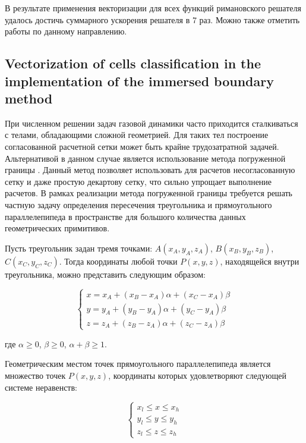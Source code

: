 \documentclass[
11pt,%
tightenlines,%
twoside,%
onecolumn,%
nofloats,%
nobibnotes,%
nofootinbib,%
superscriptaddress,%
noshowpacs,%
centertags]%
{revtex4}
\begin{document}
В результате применения векторизации для всех функций римановского решателя удалось достичь суммарного ускорения решателя в 7 раз.
Можно также отметить работы \cite{BaderSWEVect,FerreiraSWEVect} по данному направлению.

\subsection{Vectorization of cells classification in the implementation of the immersed boundary method}

При численном решении задач газовой динамики часто приходится сталкиваться с телами, обладающими сложной геометрией.
Для таких тел построение согласованной расчетной сетки может быть крайне трудозатратной задачей.
Альтернативой в данном случае является использование метода погруженной границы \cite{MittalIBM,TsengIBM}.
Данный метод позволяет использовать для расчетов несогласованную сетку и даже простую декартову сетку, что сильно упрощает выполнение расчетов.
В рамках реализации метода погруженной границы требуется решать частную задачу определения пересечения треугольника и прямоугольного параллелепипеда в пространстве для большого количества данных геометрических примитивов.

Пусть треугольник задан тремя точками: $A(x_A, y_A, z_A)$, $B(x_B, y_B, z_B)$, $C(x_C, y_C, z_C)$.
Тогда координаты любой точки $P(x, y, z)$, находящейся внутри треугольника, можно представить следующим образом:

\begin{equation}
\begin{cases}
x = x_A + (x_B - x_A)\alpha + (x_C - x_A)\beta \\
y = y_A + (y_B - y_A)\alpha + (y_C - y_A)\beta \\
z = z_A + (z_B - z_A)\alpha + (z_C - z_A)\beta
\end{cases}
\end{equation}

где $\alpha \ge 0$, $\beta \ge 0$, $\alpha + \beta \ge 1$.

Геометрическим местом точек прямоугольного параллелепипеда является множество точек $P(x, y, z)$, координаты которых удовлетворяют следующей системе неравенств:

\begin{equation}
\begin{cases}
x_l \le x \le x_h \\
y_l \le y \le y_h \\
z_l \le z \le z_h
\end{cases}
\end{equation}
\end{document}
